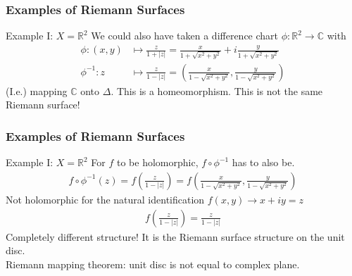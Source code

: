\documentclass{beamer}[10]
\begin{document}
\begin{frame}
	\frametitle{Examples of Riemann Surfaces}
	\begin{block}{Example I: $X=\mathds{R}^2$}
	We could also have taken a difference chart $\phi:\mathds{R}^2\to \mathds{C}$ with 
		\begin{equation}
			\begin{aligned}
			\phi:(x,y)&\mapsto \frac{z}{1+|z|}=\frac{x}{1+\sqrt{x^2+y^2}}+i\frac{y}{1+\sqrt{x^2+y^2}}\\
			\phi^{-1}:z&\mapsto \frac{z}{1-|z|}=\left(\frac{x}{1-\sqrt{x^2+y^2}},\frac{y}{1-\sqrt{x^2+y^2}}\right)
			\end{aligned}
		\end{equation}
	(I.e.) mapping $\mathds{C}$ onto $\Delta$. This is a homeomorphism. This is not the same Riemann surface!
	\end{block}
\end{frame}

\begin{frame}
	\frametitle{Examples of Riemann Surfaces}
	\begin{block}{Example I: $X=\mathds{R}^2$}
	For $f$ to be holomorphic, $f\circ \phi^{-1}$ has to also be. 
	\begin{equation}
		\begin{aligned}
			f\circ \phi^{-1}(z)=f\left(\frac{z}{1-|z|}\right)=f\left(\frac{x}{1-\sqrt{x^2+y^2}},\frac{y}{1-\sqrt{x^2+y^2}}\right)
		\end{aligned}
	\end{equation}
Not holomorphic for the natural identification $f(x,y)\to x+iy=z$
\begin{equation}
	\begin{aligned}
		f\left(\frac{z}{1-|z|}\right)=\frac{z}{1-|z|}
	\end{aligned}
\end{equation}
Completely different structure! It is the Riemann surface structure on the unit disc.\\
\vspace*{0.2cm} Riemann mapping theorem: unit disc is not equal to complex plane. 
\end{block}
	\end{frame}
\end{document}
